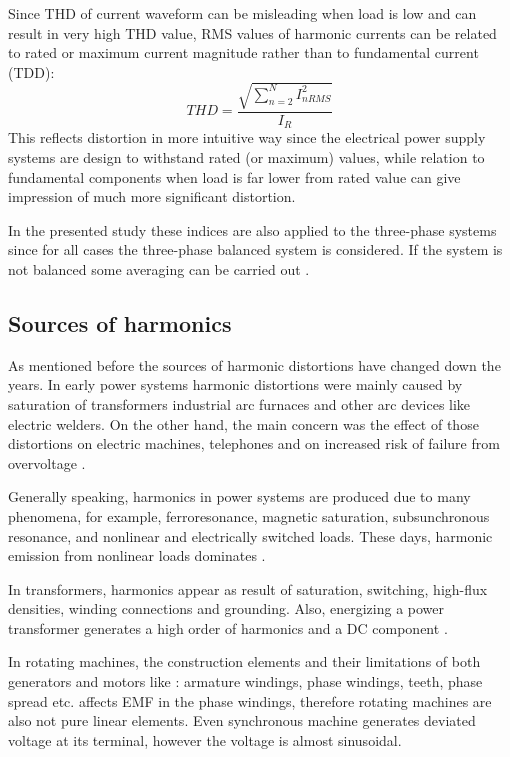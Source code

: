 \documentclass[12pt]{report} %
\begin{document}
Since THD of current waveform can be misleading when load is low and can result in very high THD value, RMS values of harmonic currents can be related to rated or maximum current magnitude rather than to fundamental current (TDD):
\begin{equation}
	THD = \frac{\sqrt{\sum_{n=2}^{N} I_{n RMS}^2}}{I_R}
\end{equation}
This reflects distortion in more intuitive way since the electrical power supply systems are design to withstand rated (or maximum) values, while relation to fundamental components when load is far lower from rated value can give impression of much more significant distortion.

In the presented study these indices are also applied to the three-phase systems since for all cases the three-phase balanced system is considered. If the system is not balanced some averaging can be carried out \cite{das}.

\subsection{Sources of harmonics}
As mentioned before the sources of harmonic distortions have changed down the years. In early power systems harmonic distortions were mainly caused by saturation of transformers industrial arc furnaces and other arc devices like electric welders. On the other hand, the main concern was the effect of those distortions on electric machines, telephones and on increased risk of failure from overvoltage \cite{rosa}.

Generally speaking, harmonics in power systems are produced due to many phenomena, for example, ferroresonance, magnetic saturation, subsunchronous resonance, and nonlinear and electrically switched loads. These days, harmonic emission from nonlinear loads dominates \cite{arrillaga}. 

In transformers, harmonics appear as result of saturation, switching, high-flux densities, winding connections and grounding. Also, energizing a power transformer generates a high order of harmonics and a DC component \cite{das}.

In rotating machines, the construction elements and their limitations of both generators and motors like \cite{das}: armature windings, phase windings, teeth, phase spread etc. affects EMF in the phase windings, therefore rotating machines are also not pure linear elements. Even synchronous machine generates deviated voltage at its terminal, however the voltage is almost sinusoidal.
\end{document}
